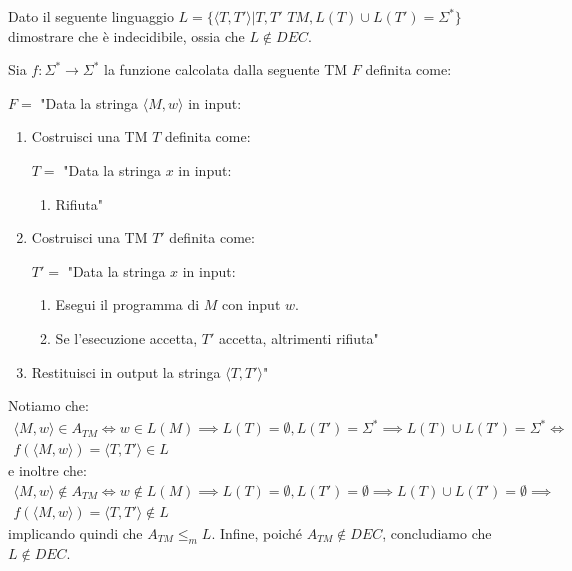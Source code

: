 \begin{Exercise}{}{}
Dato il seguente linguaggio $L = \{\langle T, T'\rangle | T, T'\textit{ TM}, L(T) \cup L(T') = \Sigma^*\}$ dimostrare che è indecidibile, ossia che $L \notin DEC$.

Sia $f : \Sigma^* \rightarrow \Sigma^*$ la funzione calcolata dalla seguente TM $F$ definita come:

$F =$ "Data la stringa $\langle M, w\rangle$ in input:
\begin{enumerate}
    \item Costruisci una TM $T$ definita come:

    $T =$ "Data la stringa $x$ in input:
    \begin{enumerate}
        \item Rifiuta"
    \end{enumerate}
    \item Costruisci una TM $T'$ definita come:
    
    $T' =$ "Data la stringa $x$ in input:
    \begin{enumerate}
        \item Esegui il programma di $M$ con input $w$.
        \item Se l’esecuzione accetta, $T'$ accetta, altrimenti rifiuta"
    \end{enumerate}
    \item Restituisci in output la stringa $\langle T, T'\rangle$"
\end{enumerate}
Notiamo che:
\begin{align*}
\langle M, w\rangle \in A_{TM} \iff w \in L(M) \implies L(T) = \emptyset, L(T') = \Sigma^* \implies L(T)\cup L(T') = \Sigma^*\iff\\ f(\langle M, w\rangle) = \langle T, T'\rangle \in L    
\end{align*}
e inoltre che:
\begin{align*}
\langle M, w\rangle \notin A_{TM} \iff w \notin L(M) \implies L(T) = \emptyset, L(T') = \emptyset \implies L(T)\cup L(T') = \emptyset\implies\\ f(\langle M, w\rangle) = \langle T, T'\rangle \notin L    
\end{align*}
implicando quindi che $A_{TM} \leq_m L$. Infine, poiché $A_{TM} \notin DEC$, concludiamo che $L\notin DEC$.
\end{Exercise}


